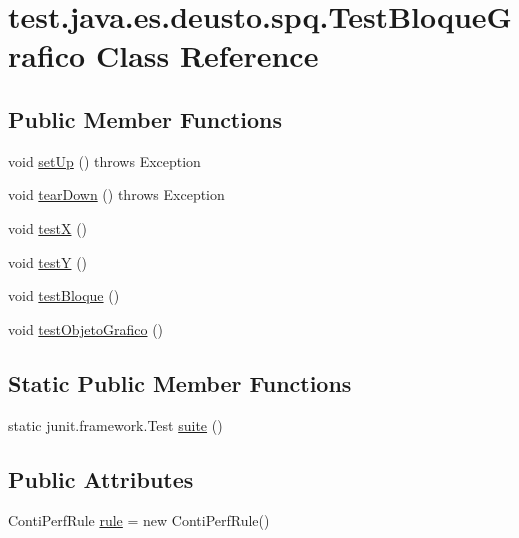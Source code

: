 \hypertarget{classtest_1_1java_1_1es_1_1deusto_1_1spq_1_1_test_bloque_grafico}{}\section{test.\+java.\+es.\+deusto.\+spq.\+Test\+Bloque\+Grafico Class Reference}
\label{classtest_1_1java_1_1es_1_1deusto_1_1spq_1_1_test_bloque_grafico}
\subsection*{Public Member Functions}
\begin{DoxyCompactItemize}
\item 
void \hyperlink{classtest_1_1java_1_1es_1_1deusto_1_1spq_1_1_test_bloque_grafico_a07a9de548bc0329b0d31c56b2292788f}{set\+Up} ()  throws Exception 
\item 
void \hyperlink{classtest_1_1java_1_1es_1_1deusto_1_1spq_1_1_test_bloque_grafico_a042ab9b04d21090e3fd4dd34ab749d30}{tear\+Down} ()  throws Exception 
\item 
void \hyperlink{classtest_1_1java_1_1es_1_1deusto_1_1spq_1_1_test_bloque_grafico_a554e9adfab0fa345027f055904d0134c}{testX} ()
\item 
void \hyperlink{classtest_1_1java_1_1es_1_1deusto_1_1spq_1_1_test_bloque_grafico_a1ee74ceabe8d673d7552e0a2b6673053}{testY} ()
\item 
void \hyperlink{classtest_1_1java_1_1es_1_1deusto_1_1spq_1_1_test_bloque_grafico_ab54edc1bbe849b9979e0c36c3641412d}{test\+Bloque} ()
\item 
void \hyperlink{classtest_1_1java_1_1es_1_1deusto_1_1spq_1_1_test_bloque_grafico_a7f7a7b9684118a9041f5e7b0508b5c9d}{test\+Objeto\+Grafico} ()
\end{DoxyCompactItemize}
\subsection*{Static Public Member Functions}
\begin{DoxyCompactItemize}
\item 
static junit.\+framework.\+Test \hyperlink{classtest_1_1java_1_1es_1_1deusto_1_1spq_1_1_test_bloque_grafico_a5b32469bb3fb226a46e01e26189e89e0}{suite} ()
\end{DoxyCompactItemize}
\subsection*{Public Attributes}
\begin{DoxyCompactItemize}
\item 
Conti\+Perf\+Rule \hyperlink{classtest_1_1java_1_1es_1_1deusto_1_1spq_1_1_test_bloque_grafico_aa38de09c9a4a9ac5445c4b6cc66c6aa6}{rule} = new Conti\+Perf\+Rule()
\end{DoxyCompactItemize}


